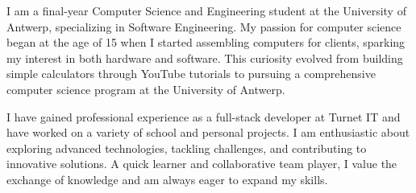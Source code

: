 
\begin{cvparagraph}
  I am a final-year Computer Science and Engineering student at the University of Antwerp, specializing in Software Engineering. My passion for computer science began at the age of 15 when I started assembling computers for clients, sparking my interest in both hardware and software. This curiosity evolved from building simple calculators through YouTube tutorials to pursuing a comprehensive computer science program at the University of Antwerp.
  
  I have gained professional experience as a full-stack developer at Turnet IT and have worked on a variety of school and personal projects. I am enthusiastic about exploring advanced technologies, tackling challenges, and contributing to innovative solutions. A quick learner and collaborative team player, I value the exchange of knowledge and am always eager to expand my skills.
\end{cvparagraph}
